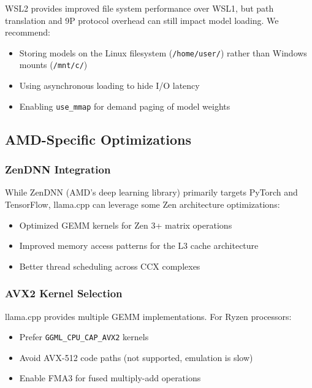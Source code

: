 WSL2 provides improved file system performance over WSL1, but path translation and 9P protocol overhead can still impact model loading. We recommend:

\begin{itemize}
    \item Storing models on the Linux filesystem (\texttt{/home/user/}) rather than Windows mounts (\texttt{/mnt/c/})
    \item Using asynchronous loading to hide I/O latency
    \item Enabling \texttt{use\_mmap} for demand paging of model weights
\end{itemize}

\subsection{AMD-Specific Optimizations}

\subsubsection{ZenDNN Integration}

While ZenDNN (AMD's deep learning library) primarily targets PyTorch and TensorFlow, llama.cpp can leverage some Zen architecture optimizations:

\begin{itemize}
    \item Optimized GEMM kernels for Zen 3+ matrix operations
    \item Improved memory access patterns for the L3 cache architecture
    \item Better thread scheduling across CCX complexes
\end{itemize}

\subsubsection{AVX2 Kernel Selection}

llama.cpp provides multiple GEMM implementations. For Ryzen processors:

\begin{itemize}
    \item Prefer \texttt{GGML\_CPU\_CAP\_AVX2} kernels
    \item Avoid AVX-512 code paths (not supported, emulation is slow)
    \item Enable FMA3 for fused multiply-add operations
\end{itemize}

